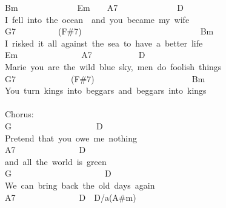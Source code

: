 \documentclass[]{book}
\begin{document}
Bm~~~~~~~~~~~~~~Em~~~~A7~~~~~~~~~~~~~~D\\
I~fell~into~the~ocean~~and~you~became~my~wife\\
G7~~~~~~~~~~(F\#7)~~~~~~~~~~~~~~~~~~~~~~~~~~~~Bm\\
\hspace*{0.333em}I~risked~it~all~against~the~sea~to~have~a~better~life\\
\hspace*{0.333em}\hspace*{0.333em}\hspace*{0.333em}\hspace*{0.333em}\hspace*{0.333em}\hspace*{0.333em}\hspace*{0.333em}\hspace*{0.333em}\hspace*{0.333em}\hspace*{0.333em}\hspace*{0.333em}Em~~~~~~~~~~~~~~~A7~~~~~~~~~~~D\\
Marie~you~are~the~wild~blue~sky,~men~do~foolish~things\\
G7~~~~~~~~~~~~~(F\#7)~~~~~~~~~~~~~~~~~~~~~~~Bm\\
\hspace*{0.333em}You~turn~kings~into~beggars~and~beggars~into~kings\\
~\\
Chorus:\\
\hspace*{0.333em}\hspace*{0.333em}\hspace*{0.333em}G~~~~~~~~~~~~~~~~~~~~D~~\\
Pretend~that~you~owe~me~nothing~~~~~~\\
\hspace*{0.333em}\hspace*{0.333em}\hspace*{0.333em}\hspace*{0.333em}A7~~~~~~~~~~~~~~~D\\
and~all~the~world~is~green\\
G~~~~~~~~~~~~~~~~~~~~~~D~~~~~~~~~\\
\hspace*{0.333em}We~can~bring~back~the~old~days~again~~~~~\\
\hspace*{0.333em}\hspace*{0.333em}\hspace*{0.333em}\hspace*{0.333em}\hspace*{0.333em}A7~~~~~~~~~~~~~~~D~~D/a(A\#m)\\
\end{document}
